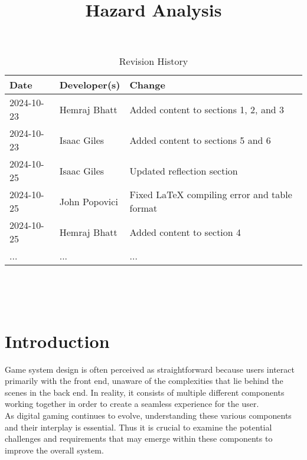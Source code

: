 \documentclass{article}
\title{Hazard Analysis\\\progname}
\author{\authname}
\date{}
\begin{document}
\maketitle
\thispagestyle{empty}



\begin{table}[hp]
\caption{Revision History} \label{TblRevisionHistory}
\begin{tabularx}{\textwidth}{llX}
\toprule
\textbf{Date} & \textbf{Developer(s)} & \textbf{Change}\\
\midrule
2024-10-23 & Hemraj Bhatt & Added content to sections 1, 2, and 3\\
2024-10-23 & Isaac Giles & Added content to sections 5 and 6 \\
2024-10-25 & Isaac Giles & Updated reflection section \\
2024-10-25 & John Popovici & Fixed LaTeX compiling error and table format \\
2024-10-25 & Hemraj Bhatt & Added content to section 4\\
... & ... & ...\\
\bottomrule
\end{tabularx}
\end{table}

~\newpage

\tableofcontents

~\newpage



\section{Introduction}

Game system design is often perceived as straightforward because users interact primarily with the front end, unaware of the complexities that lie behind the scenes in the back end. In reality, it consists of multiple different components working together in order to create a seamless experience for the user.\\

As digital gaming continues to evolve, understanding these various components and their interplay is essential. Thus it is crucial to examine the potential challenges and requirements that may emerge within these components to improve the overall system.
\end{document}
